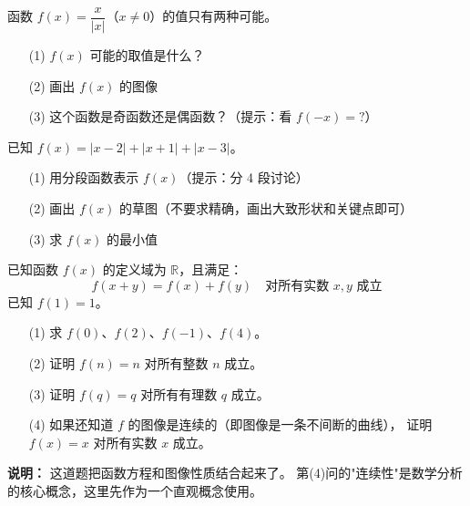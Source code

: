 \begin{exercise}[6]
函数 \(f(x) = \dfrac{x}{|x|}\)（\(x \neq 0\)）的值只有两种可能。
\begin{enumerate}
  \item[(1)] \(f(x)\) 可能的取值是什么？
  \item[(2)] 画出 \(f(x)\) 的图像
  \item[(3)] 这个函数是奇函数还是偶函数？（提示：看 \(f(-x) = ?\)）
\end{enumerate}
\end{exercise}

\begin{exercise}[6]
已知 \(f(x) = |x - 2| + |x + 1| + |x - 3|\)。
\begin{enumerate}
  \item[(1)] 用分段函数表示 \(f(x)\)（提示：分 4 段讨论）
  \item[(2)] 画出 \(f(x)\) 的草图（不要求精确，画出大致形状和关键点即可）
  \item[(3)] 求 \(f(x)\) 的最小值
\end{enumerate}
\end{exercise}


\begin{exercise}[7]
已知函数 \(f(x)\) 的定义域为 \(\mathbb{R}\)，且满足：
\[
f(x + y) = f(x) + f(y) \quad \text{对所有实数 } x, y \text{ 成立}
\]
已知 \(f(1) = 1\)。

\begin{enumerate}
  \item[(1)] 求 \(f(0)\)、\(f(2)\)、\(f(-1)\)、\(f(4)\)。
  \item[(2)] 证明 \(f(n) = n\) 对所有整数 \(n\) 成立。
  \item[(3)] 证明 \(f(q) = q\) 对所有有理数 \(q\) 成立。
  \item[(4)] 如果还知道 \(f\) 的图像是连续的（即图像是一条不间断的曲线），
        证明 \(f(x) = x\) 对所有实数 \(x\) 成立。
\end{enumerate}

\textbf{说明：} 这道题把函数方程和图像性质结合起来了。
第(4)问的"连续性"是数学分析的核心概念，这里先作为一个直观概念使用。
\end{exercise}
